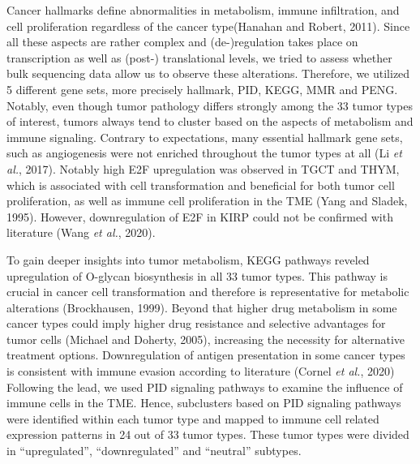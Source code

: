 \documentclass[
  parskip,
  oneside]{scrreprt}
\begin{document}
Cancer hallmarks define abnormalities in metabolism, immune
infiltration, and cell proliferation regardless of the cancer
type(Hanahan and Robert, 2011). Since all these aspects are rather
complex and (de-)regulation takes place on transcription as well as
(post-) translational levels, we tried to assess whether bulk sequencing
data allow us to observe these alterations. Therefore, we utilized 5
different gene sets, more precisely hallmark, PID, KEGG, MMR and PENG.
Notably, even though tumor pathology differs strongly among the 33 tumor
types of interest, tumors always tend to cluster based on the aspects of
metabolism and immune signaling. Contrary to expectations, many
essential hallmark gene sets, such as angiogenesis were not enriched
throughout the tumor types at all (Li \emph{et al.}, 2017). Notably high
E2F upregulation was observed in TGCT and THYM, which is associated with
cell transformation and beneficial for both tumor cell proliferation, as
well as immune cell proliferation in the TME (Yang and Sladek, 1995).
However, downregulation of E2F in KIRP could not be confirmed with
literature (Wang \emph{et al.}, 2020).

To gain deeper insights into tumor metabolism, KEGG pathways reveled
upregulation of O-glycan biosynthesis in all 33 tumor types. This
pathway is crucial in cancer cell transformation and therefore is
representative for metabolic alterations (Brockhausen, 1999). Beyond
that higher drug metabolism in some cancer types could imply higher drug
resistance and selective advantages for tumor cells (Michael and
Doherty, 2005), increasing the necessity for alternative treatment
options. Downregulation of antigen presentation in some cancer types is
consistent with immune evasion according to literature (Cornel \emph{et
al.}, 2020) Following the lead, we used PID signaling pathways to
examine the influence of immune cells in the TME. Hence, subclusters
based on PID signaling pathways were identified within each tumor type
and mapped to immune cell related expression patterns in 24 out of 33
tumor types. These tumor types were divided in ``upregulated'',
``downregulated'' and ``neutral'' subtypes.
\end{document}
